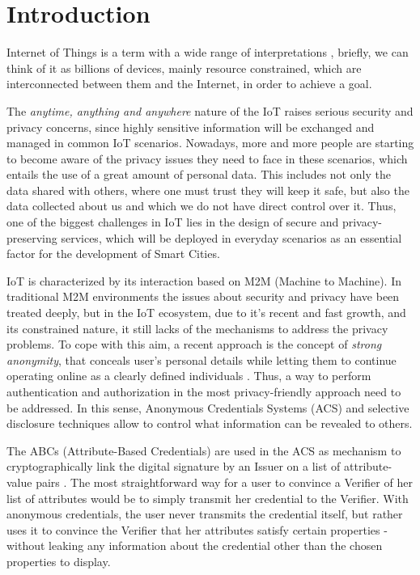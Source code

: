 \section{Introduction}

Internet of Things is a term with a wide range of interpretations \cite{Atzori20102787}, briefly, we can think of it as billions of devices, mainly resource constrained, which are interconnected between them and the Internet, in order to achieve a goal.

The \textit{anytime, anything and anywhere} nature of the IoT raises serious security and privacy concerns, since highly sensitive information will be exchanged and managed in common IoT scenarios.  Nowadays, more and more people are starting to become aware of the privacy issues they need to face in these scenarios, which entails the use of a great amount of personal data. This includes not only the data shared with others, where one must trust they will keep it safe, but also the data collected about us and which we do not have direct control over it. Thus, one of the biggest challenges in IoT lies in the design of secure and privacy-preserving services, which will be deployed in everyday scenarios as an essential factor for the development of Smart Cities.

IoT is characterized by its interaction based on M2M (Machine to Machine). In traditional M2M environments the issues about security and privacy have been treated deeply, but in the IoT ecosystem, due to it's recent and fast growth, and its constrained nature, it still lacks of the mechanisms to address the privacy problems. To cope with this aim, a recent approach is the concept of \textit{strong anonymity}, that conceals user's personal details while letting them to continue operating online as a clearly defined individuals \cite{stronganonymity}. Thus, a way to perform authentication and authorization in the most privacy-friendly approach need to be addressed. In this sense, Anonymous Credentials Systems (ACS) \cite{camenisch2001efficient} and selective disclosure techniques allow to control what information can be revealed to others.

The ABCs (Attribute-Based Credentials) are used in the ACS as mechanism to cryptographically link the digital signature by an Issuer on a list of attribute-value pairs \cite{introCredIBM}. The most straightforward way for a user to convince a Verifier of her list of attributes would be to simply transmit her credential to the Verifier. With anonymous credentials, the user never transmits the credential itself, but rather uses it to convince the Verifier that her attributes satisfy certain properties - without leaking any information about the credential other than the chosen properties to display. 

